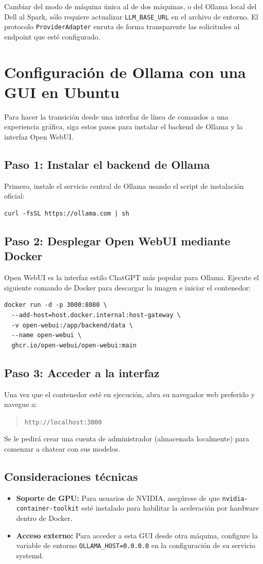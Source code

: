 Cambiar del modo de máquina única al de dos máquinas, o del Ollama local
del Dell al Spark, sólo requiere actualizar \texttt{LLM\_BASE\_URL} en
el archivo de entorno. El protocolo \texttt{ProviderAdapter} enruta de
forma transparente las solicitudes al endpoint que esté configurado.

\section{Configuración de Ollama con una GUI en Ubuntu}

Para hacer la transición desde una interfaz de línea de comandos a una experiencia gráfica, siga estos pasos para instalar el backend de Ollama y la interfaz Open WebUI.

\subsection{Paso 1: Instalar el backend de Ollama}
Primero, instale el servicio central de Ollama usando el script de instalación oficial:
\begin{verbatim}
curl -fsSL https://ollama.com | sh
\end{verbatim}

\subsection{Paso 2: Desplegar Open WebUI mediante Docker}
Open WebUI es la interfaz estilo ChatGPT más popular para Ollama. Ejecute el siguiente comando de Docker para descargar la imagen e iniciar el contenedor:
\begin{verbatim}
docker run -d -p 3000:8080 \
  --add-host=host.docker.internal:host-gateway \
  -v open-webui:/app/backend/data \
  --name open-webui \
  ghcr.io/open-webui/open-webui:main
\end{verbatim}

\subsection{Paso 3: Acceder a la interfaz}
Una vez que el contenedor esté en ejecución, abra su navegador web preferido y navegue a:
\begin{quote}
    \texttt{http://localhost:3000}
\end{quote}
Se le pedirá crear una cuenta de administrador (almacenada localmente) para comenzar a chatear con sus modelos.

\subsection{Consideraciones técnicas}
\begin{itemize}
    \item \textbf{Soporte de GPU:} Para usuarios de NVIDIA, asegúrese de que \texttt{nvidia-container-toolkit} esté instalado para habilitar la aceleración por hardware dentro de Docker.
    \item \textbf{Acceso externo:} Para acceder a esta GUI desde otra máquina, configure la variable de entorno \texttt{OLLAMA\_HOST=0.0.0.0} en la configuración de su servicio systemd.
\end{itemize}

